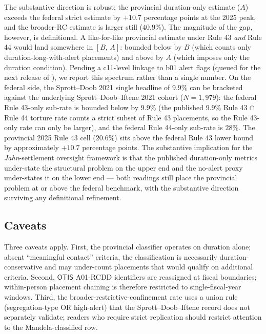 \documentclass[article,shortnames,nojss]{jss}
\newcommand{\OTIS}{\textsf{OTIS}}
\begin{document}
The substantive direction is robust: the provincial duration-only
estimate ($A$) exceeds the federal strict estimate by
$+10.7$ percentage points at the 2025 peak, and the broader-RC
estimate is larger still ($40.9\%$).  The magnitude of the gap,
however, is definitional.  A like-for-like provincial estimate
under Rule 43 \emph{and} Rule 44 would land somewhere in
$[B,\,A]$: bounded below by $B$ (which counts only
duration-long-with-alert placements) and above by $A$ (which
imposes only the duration condition).  Pending a c11-level
linkage to b01 alert flags (queued for the next release of
), we report this spectrum rather
than a single number.  On the federal side, the Sprott--Doob 2021
single headline of $9.9\%$ can be bracketed against the underlying
Sprott--Doob--Iftene 2021 cohort ($N=1{,}979$): the federal
Rule 43-only sub-rate is bounded below by $9.9\%$ (the published
$9.9\%$ Rule 43 $\cap$ Rule 44 torture rate counts a strict subset
of Rule 43 placements, so the Rule 43-only rate can only be
larger), and the federal Rule 44-only sub-rate is
$28\%$.  The provincial 2025 Rule 43 cell ($20.6\%$) sits above
the federal Rule 43 lower bound by approximately $+10.7$
percentage points.  The substantive implication for the
\emph{Jahn}-settlement oversight framework is that the published
duration-only metrics under-state the structural problem on the
upper end and the no-alert proxy under-states it on the lower
end --- both readings still place the provincial problem at or
above the federal benchmark, with the substantive direction
surviving any definitional refinement.

\subsection{Caveats}

Three caveats apply. First, the provincial classifier operates on
duration alone; absent ``meaningful contact'' criteria, the
classification is necessarily duration-conservative and may
under-count placements that would qualify on additional criteria.
Second, $\OTIS$ A01-RCDD identifiers are reassigned at fiscal
boundaries; within-person placement chaining is therefore
restricted to single-fiscal-year windows. Third, the
broader-restrictive-confinement rate uses a union rule
(segregation-type OR high-alert) that the Sprott--Doob--Iftene
record does not separately validate; readers who require strict
replication should restrict attention to the Mandela-classified
row.
\end{document}
